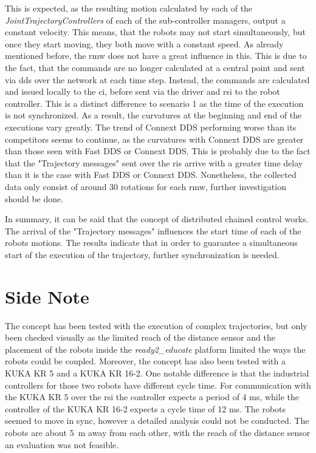 This is expected, as the resulting motion calculated by each of the \textit{JointTrajectoryControllers} of each of the sub-controller managers, output a constant velocity. This means, that the robots may not start simultaneously, but once they start moving, they both move with a constant speed. As already mentioned before, the \gls{rmw} does not have a great influence in this. This is due to the fact, that the commands are no longer calculated at a central point and sent via \gls{dds} over the network at each time step. Instead, the commands are calculated and issued locally to the \gls{ci}, before sent via the driver and \gls{rsi} to the robot controller. This is a distinct difference to scenario 1 as the time of the execution is not synchronized. As a result, the curvatures at the beginning and end of the executions vary greatly. The trend of Connext DDS performing worse than its competitors seems to continue, as the curvatures with Connext DDS are greater than those seen with Fast DDS or Connext DDS. This is probably due to the fact that the "Trajectory messages" sent over the \glspl{ri} arrive with a greater time delay than it is the case with Fast DDS or Connext DDS. Nonetheless, the collected data only consist of around 30 rotations for each \gls{rmw}, further investigation should be done.

In summary, it can be said that the concept of distributed chained control works. The arrival of the "Trajectory messages" influences the start time of each of the robots motions. The results indicate that in order to guarantee a simultaneous start of the execution of the trajectory, further synchronization is needed. 

\section*{Side Note}
The concept has been tested with the execution of complex trajectories, but only been checked visually as the limited reach of the distance sensor and the placement of the robots inside the \textit{ready2\_educate} platform limited the ways the robots could be coupled.\newline
Moreover, the concept has also been tested with a KUKA KR 5 and a KUKA KR 16-2. One notable difference is that the industrial controllers for those two robots have different cycle time. For communication with the KUKA KR 5 over the \gls{rsi} the controller expects a period of 4 \si{\milli\second}, while the controller of the KUKA KR 16-2 expects a cycle time of 12 \si{\milli\second}. The robots seemed to move in sync, however a detailed analysis could not be conducted. The robots are about 5 m away from each other, with the reach of the distance sensor an evaluation was not feasible. 


